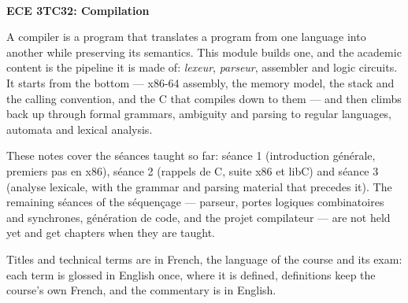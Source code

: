 \documentclass[10pt]{article}
\begin{document}
\thispagestyle{empty}
\bigskip \
\vspace{0.1cm}

\begin{center}
{\fontsize{30}{30} \selectfont \bf \sffamily ECE 3TC32: Compilation }\\
\vspace{24pt}
\end{center}

{\parindent0pt \baselineskip=15.5pt
  A compiler is a program that translates a program from one language into
  another while preserving its semantics. This module builds one, and the
  academic content is the pipeline it is made of: \textit{lexeur},
  \textit{parseur}, assembler and logic circuits. It starts from the bottom ---
  x86-64 assembly, the memory model, the stack and the calling convention, and
  the C that compiles down to them --- and then climbs back up through formal
  grammars, ambiguity and parsing to regular languages, automata and lexical
  analysis.

  \medskip
  These notes cover the séances taught so far: séance 1 (introduction
  générale, premiers pas en x86), séance 2 (rappels de C, suite x86 et
  libC) and séance 3 (analyse lexicale, with the grammar and parsing material
  that precedes it). The remaining séances of the séquençage ---
  parseur, portes logiques combinatoires and synchrones, génération de code,
  and the projet compilateur --- are not held yet and get chapters when they
  are taught.

  \medskip
  Titles and technical terms are in French, the language of the course and its exam:
  each term is glossed in English once, where it is defined, definitions keep the
  course's own French, and the commentary is in English.
}

\microtoc%
\newpage

\setcounter{section}{-1}








\end{document}

